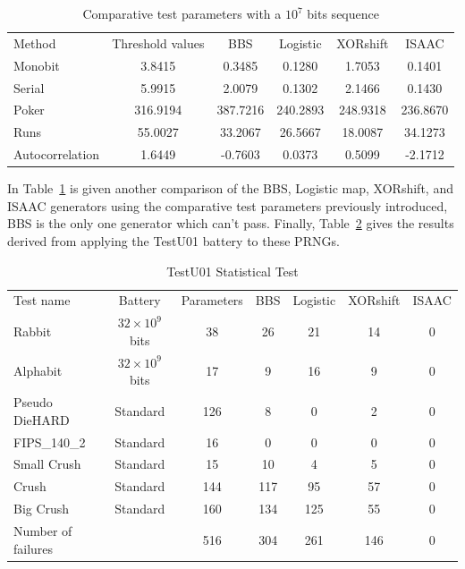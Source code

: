\begin{table}[!t]
\renewcommand{\arraystretch}{1.3}
\caption{Comparative test parameters with a $10^7$ bits sequence}
\label{Comparison3}
\centering
\begin{tabular}{lccccc}
 \toprule
Method			&Threshold values 	 &BBS		&Logistic	& XORshift	& ISAAC\\
Monobit			&3.8415			&0.3485&0.1280		&1.7053		&0.1401\\ \hline
Serial		&5.9915 		&2.0079	 &0.1302		&2.1466		&0.1430\\ \hline
Poker			&316.9194 		&387.7216 	&240.2893	&248.9318	&236.8670\\ \hline
Runs 			&55.0027		&33.2067	&26.5667	&18.0087	&34.1273 \\ \hline
Autocorrelation		&1.6449			&-0.7603	& 0.0373	&0.5099 	&-2.1712\\ 
\bottomrule
\end{tabular}
\end{table}

In Table~\ref{Comparison3} is given another comparison of the BBS,
Logistic map, XORshift, and ISAAC generators using the comparative test 
parameters previously introduced, BBS is the only one generator which can't pass.
Finally, Table~\ref{TestU011} gives the results derived from applying the 
TestU01 battery to these PRNGs.
\begin{table}[!t]
\renewcommand{\arraystretch}{1.3}
\caption{TestU01 Statistical Test}
\label{TestU011}
\centering
\begin{tabular}{lcccccc}
\toprule
Test name &Battery&Parameters &BBS& Logistic 		& XORshift	& ISAAC\\
Rabbit 				&$32\times10^9$ bits	&38 &26	&21	 	&14	&0	 \\
Alphabit 			&$32\times10^9$ bits	&17 &9	&16 		&9	&0	 \\
Pseudo DieHARD 			&Standard		&126 &8	&0 	 	&2	&0	\\
FIPS\_140\_2 			&Standard		&16&0	&0 		&0	&0	\\
Small Crush 			&Standard		&15 &10	&4 		&5	&0	 \\
Crush 				&Standard		&144 &117	&95 		&57	&0	 \\
Big Crush 			&Standard		&160 &134	&125 	 	&55	&0	 \\ \hline
Number of failures 		& 			&516 &304	&261 	 	&146	&0	 \\
\bottomrule
\end{tabular}
\end{table}



